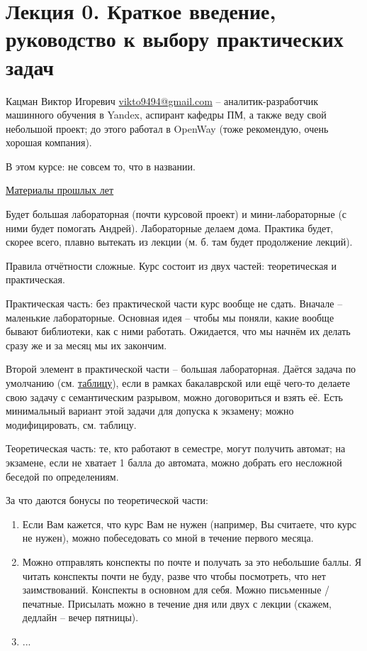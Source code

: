 \documentclass[main.tex]{subfiles}
\begin{document}
\section{Лекция 0. Краткое введение, руководство к выбору практических задач} %

Кацман Виктор Игоревич \href{mailto:vikto9494@gmail.com}{vikto9494@gmail.com} -- аналитик-разработчик машинного обучения в Yandex, аспирант кафедры ПМ, а также веду свой небольшой проект; до этого работал в OpenWay (тоже рекомендую, очень хорошая компания).

В этом курсе: не совсем то, что в названии.

\href{https://drive.google.com/drive/u/0/folders/1gItRk7-yscR5AXBk26G6O33JU7StZNkU}{Материалы прошлых лет}

Будет большая лабораторная (почти курсовой проект) и мини-лабораторные (с ними будет помогать Андрей). Лабораторные делаем дома. Практика будет, скорее всего, плавно вытекать из лекции (м. б. там будет продолжение лекций).

Правила отчётности сложные. Курс состоит из двух частей: теоретическая и практическая.

Практическая часть: без практической части курс вообще не сдать. Вначале -- маленькие лабораторные.
Основная идея -- чтобы мы поняли, какие вообще бывают библиотеки, как с ними работать.
Ожидается, что мы начнём их делать сразу же и за месяц мы их закончим.

Второй элемент в практической части -- большая лабораторная.
Даётся задача по умолчанию (см. \href{https://docs.google.com/spreadsheets/d/1CrtpI9oEBldscjZSrAinBPnJN01S5UECVl5VxgtM_ic/edit#gid=506672535}{таблицу}), если в рамках бакалаврской или ещё чего-то делаете свою задачу с семантическим разрывом, можно договориться и взять её.
Есть минимальный вариант этой задачи для допуска к экзамену; можно модифицировать, см. таблицу.

Теоретическая часть: те, кто работают в семестре, могут получить автомат; на экзамене, если не хватает 1 балла до автомата, можно добрать его несложной беседой по определениям.

За что даются бонусы по теоретической части:

\begin{enumerate}[noitemsep]
    \item Если Вам кажется, что курс Вам не нужен (например, Вы считаете, что курс не нужен), можно побеседовать со мной в течение первого месяца.
    \item Можно отправлять конспекты по почте и получать за это небольшие баллы.
    Я читать конспекты почти не буду, разве что чтобы посмотреть, что нет заимствований.
    Конспекты в основном для себя.
    Можно письменные / печатные.
    Присылать можно в течение дня или двух с лекции (скажем, дедлайн -- вечер пятницы).
    \item ...
\end{enumerate}
\end{document}
